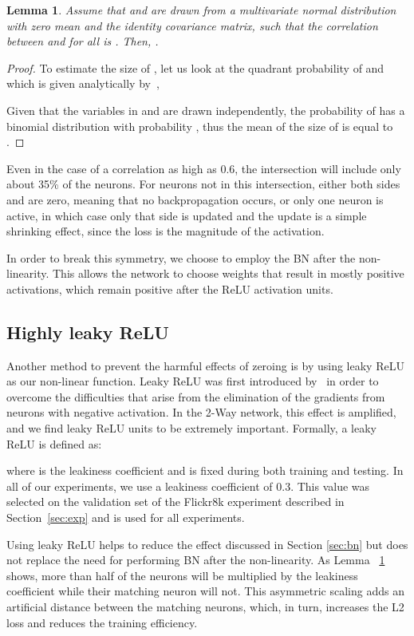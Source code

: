 \documentclass[10pt,twocolumn,letterpaper]{article}
\newtheorem{lemma}{Lemma}
\begin{document}
\begin{lemma}\label{lemma:bn}
Assume that  and  are drawn from a multivariate normal distribution with zero mean and the identity covariance matrix, such that the correlation between  and  for all  is . Then,
.
\end{lemma}

\begin{proof}
To estimate the size of , let us look at the quadrant probability of  and  which is given analytically by~\cite{kendall},
 
Given that the variables in  and  are drawn independently, the probability of  has a binomial distribution with probability , thus the mean of the size of  is equal to
. \end{proof}

Even in the case of a correlation as high as 0.6, the intersection will include only about 35\% of the neurons. For neurons  not in this intersection, either both sides  and  are zero, meaning that no backpropagation occurs, or only one neuron is active, in which case only that side is updated and the update is a simple shrinking effect, since the loss is the magnitude of the activation. 

In order to break this symmetry, we choose to employ the BN after the non-linearity. This allows the network to choose weights that result in mostly positive activations, which remain positive after the ReLU activation units. 

\subsection{Highly leaky ReLU}

Another method to prevent the harmful effects of zeroing is by using leaky ReLU as our non-linear function. Leaky ReLU was first introduced by~\cite{relu2} in order to overcome the difficulties that arise from the elimination of the gradients from neurons with negative activation. In the 2-Way network, this effect is amplified, and we find leaky ReLU units to be extremely important. Formally, a leaky ReLU is defined as:

where  is the leakiness coefficient and is fixed during both training and testing. In all of our experiments, we use a leakiness coefficient of 0.3. This value was selected on the validation set of the Flickr8k experiment described in Section~\ref{sec:exp} and is used for all experiments.

Using leaky ReLU helps to reduce the effect discussed in Section \ref{sec:bn} but does not replace the need for performing BN after the non-linearity. As Lemma ~\ref{lemma:bn} shows, more than half of the neurons will be multiplied by the leakiness coefficient while their matching neuron will not. This asymmetric scaling adds an artificial distance between the matching neurons, which, in turn, increases the L2 loss and reduces the training efficiency. 
\end{document}
